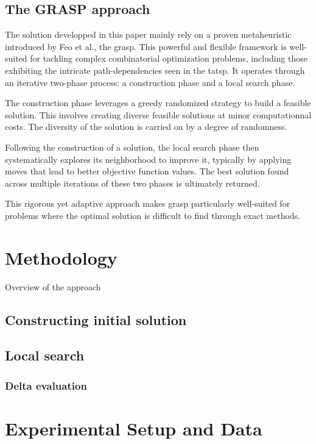\documentclass[twocolumn, switch]{article} %
\begin{document}
\subsection{The GRASP approach}

The solution developped in this paper mainly rely on a proven metaheuristic introduced by Feo et al.\cite{Feo1995}, the \gls{grasp}. 
This powerful and flexible framework is well-suited for tackling complex combinatorial optimization problems, 
including those exhibiting the intricate path-dependencies seen in the \gls{tatsp}. It operates through an iterative 
two-phase process: a construction phase and a local search phase. 

The construction phase leverages a greedy randomized strategy to build a feasible solution. This involves creating diverse feasible 
solutions at minor computationnal costs. The diversity of the solution is carried on by a degree of randomness. 

Following the construction of a solution, the local search phase then systematically explores its neighborhood to improve it, 
typically by applying moves that lead to better objective function values. The best solution found across multiple iterations of 
these two phases is ultimately returned. 

This rigorous yet adaptive approach makes \gls{grasp} particularly well-suited for problems where the optimal solution is difficult 
to find through exact methods.

\section{Methodology}
Overview of the approach 

\subsection{Constructing initial solution}
\lipsum[5]

\subsection{Local search}
\lipsum[6]

\subsubsection{Delta evaluation}
\lipsum[7]

\section{Experimental Setup and Data}
\lipsum[8]
\end{document}
